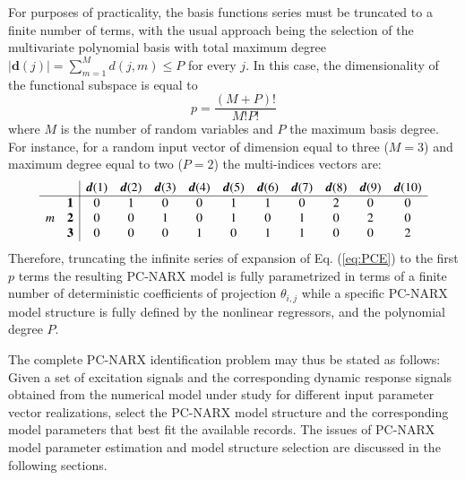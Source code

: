 \documentclass[preprint,3p,review,times,11pt]{elsarticle}
\newcommand{\bld}[1]{\boldsymbol{#1}}
\begin{document}
For purposes of practicality, the basis functions series must be truncated to a finite number of terms, with the usual approach being the selection of the multivariate polynomial basis with total maximum degree $| {\bld d}(j)| = \sum_{m=1}^{M} d{(j,m)} \leq P $ for every $j$. In this case, the dimensionality of the functional subspace is equal to
$$ p = \frac{(M+P) !}{M! P !}$$
where $M$ is the number of random variables and $P$ the maximum basis degree. For instance, for a random input vector of dimension equal to three ($M=3$) and maximum degree equal to two ($P = 2$) the multi-indices vectors are:
$$
\begin{array}{r | cccccccccc}
& {\bld d}{(1)} & {\bld d}{(2)} & {\bld d}{(3)} & {\bld d}{(4)} &
{\bld d}{(5)} & {\bld d}{(6)} & {\bld d}{(7)} & {\bld d}{(8)} &  
{\bld d}{(9)} & {\bld d}{(10)} \\ \hline
{\bld 1} & 0 & 1 & 0 & 0 & 1 & 1 & 0 & 2 & 0 & 0 \\
m \quad {\bld 2} & 0 & 0 & 1 & 0 & 1 & 0 & 1 & 0 & 2 & 0 \\
{\bld 3} & 0 & 0 & 0 & 1 & 0 & 1 & 1 & 0 & 0 & 2 \\
\end{array}
$$
Therefore, truncating the infinite series of expansion of Eq. (\ref{eq:PCE}) to the first $p$ terms the resulting PC-NARX model is fully parametrized in terms of a finite number of deterministic coefficients of projection $\theta_{i,j}$ while a specific PC-NARX model structure is fully defined by the nonlinear regressors, and the polynomial degree $P$. 


The complete PC-NARX identification problem may thus be stated as follows: Given a set of excitation signals and the corresponding dynamic response signals obtained from the numerical model under study for different input parameter vector realizations, select the PC-NARX model structure and the corresponding model parameters that best fit the available records. The issues of PC-NARX model parameter estimation and model structure selection are discussed in the following sections. 


\end{document}
